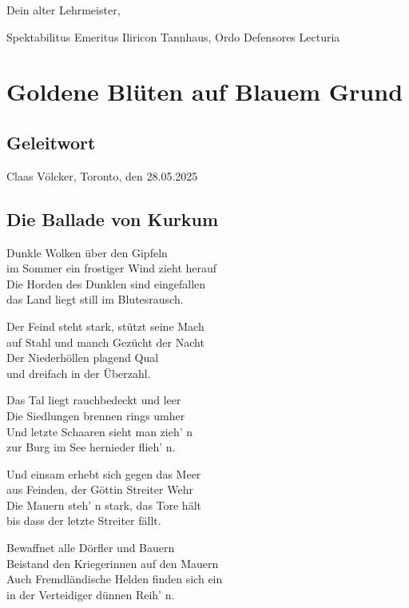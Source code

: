 Dein alter Lehrmeister,

Spektabilitus Emeritus Iliricon Tannhaus, Ordo Defensores Lecturia
\chapter{Goldene Blüten auf Blauem Grund}

\section{Geleitwort}


\begin{flushright}
Claas Völcker, Toronto, den 28.05.2025
\end{flushright}

\section{Die Ballade von Kurkum}

Dunkle Wolken über den Gipfeln\\
im Sommer ein frostiger Wind zieht herauf\\
Die Horden des Dunklen sind eingefallen\\
das Land liegt still im Blutesrausch.

Der Feind steht stark, stützt seine Mach\\
auf Stahl und manch Gezücht der Nacht\\
Der Niederhöllen plagend Qual\\
und dreifach in der Überzahl.

Das Tal liegt rauchbedeckt und leer\\
Die Siedlungen brennen rings umher\\
Und letzte Schaaren sieht man zieh' n\\
zur Burg im See hernieder flieh' n.

Und einsam erhebt sich gegen das Meer\\
aus Feinden, der Göttin Streiter Wehr\\
Die Mauern steh' n stark, das Tore hält\\
bis dass der letzte Streiter fällt.

Bewaffnet alle Dörfler und Bauern\\
Beistand den Kriegerinnen auf den Mauern\\
Auch Fremdländische Helden finden sich ein\\
in der Verteidiger dünnen Reih' n.


